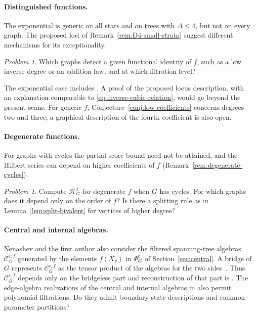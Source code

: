 \documentclass[reqno]{article}
\theoremstyle{plain} %
\theoremstyle{definition}
\theoremstyle{remark}
\newtheorem{problem}[theorem]{Problem}
\newcommand {\CC}{\mathscr{C}}
\newcommand{\hs}{\mathscr{H}}
\numberwithin{equation}{section}
\begin{document}
\paragraph{Distinguished functions.}
The exponential is generic on all stars and on trees with $\Delta\le4$,
but not on every graph. The proposed loci of
Remark~\ref{rem:D4-small-strata} suggest different mechanisms for its
exceptionality.
\begin{problem}\label{prob:exp}
Which graphs detect a given functional identity of $f$, such as a low
inverse degree or an addition law, and at which filtration level?
\end{problem}
The exponential case includes \cite[Problem~3]{NSh}. A proof of the
proposed locus description, with an explanation comparable to
\eqref{eq:inverse-cubic-relation}, would go beyond the present scans.
For generic $f$, Conjecture~\ref{conj:low-coefficients} concerns degrees
two and three; a graphical description of the fourth coefficient is
also open.

\paragraph{Degenerate functions.}
For graphs with cycles the partial-score bound need not be attained,
and the Hilbert series can depend on higher coefficients of $f$
(Remark~\ref{rem:degenerate-cycles}).
\begin{problem}\label{prob:degenerate}
Compute $\hs_G^f$ for degenerate $f$ when $G$ has cycles. For which
graphs does it depend only on the order of $f$? Is there a splitting
rule as in Lemma~\ref{lem:split-bivalent} for vertices of higher degree?
\end{problem}

\paragraph{Central and internal algebras.}
Nenashev and the first author also consider the filtered spanning-tree algebras $\CC_G^{{\mathrm c},f}$ generated by the elements $f(X_v)$ in $\Phi_G^{\mathrm c}$ of Section~\ref{sec:central}.
A bridge of $G$ represents $\CC_G^{{\mathrm c},f}$ as the tensor product of the algebras for the two sides~\cite[Proposition~5]{NSh}. Thus  $\CC_G^{{\mathrm c},f}$ depends only on
the bridgeless part and reconstruction of that part is
\cite[Problem~7]{NSh}. The edge-algebra realizations of the central and
internal algebras in \cite[Theorem~7]{KN2} also permit polynomial
filtrations. Do they admit boundary-state descriptions and common
parameter partitions?
\end{document}
